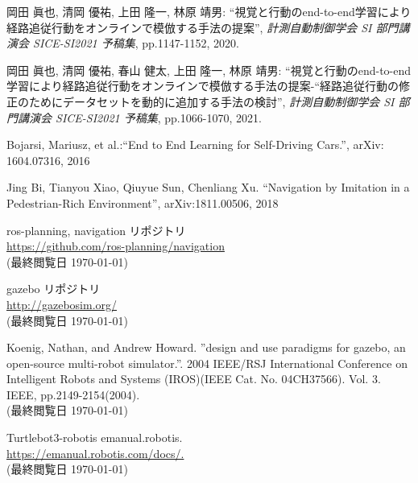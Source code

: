 \documentclass{ujarticle}
\begin{document}
\footnotesize
\begin{thebibliography}{99}

岡田 眞也, 清岡 優祐, 上田 隆一, 林原 靖男: ``視覚と行動のend-to-end学習により経路追従行動をオンラインで模倣する手法の提案'', \textit{計測自動制御学会 SI 部門講演会 SICE-SI2021 予稿集}, pp.1147-1152, 2020.

岡田 眞也, 清岡 優祐, 春山 健太, 上田 隆一, 林原 靖男: ``視覚と行動のend-to-end学習により経路追従行動をオンラインで模倣する手法の提案-“経路追従行動の修正のためにデータセットを動的に追加する手法の検討'', \textit{計測自動制御学会 SI 部門講演会 SICE-SI2021 予稿集}, pp.1066-1070, 2021.	

Bojarsi, Mariusz, et al.:``End to End Learning for Self-Driving Cars.'', arXiv: 1604.07316, 2016

Jing Bi, Tianyou Xiao, Qiuyue Sun, Chenliang Xu. ``Navigation by Imitation in a Pedestrian-Rich Environment'', 	arXiv:1811.00506, 2018


ros-planning, navigation リポジトリ\\
\url{https://github.com/ros-planning/navigation}\\
(最終閲覧日 \today)

gazebo リポジトリ\\
\url{http://gazebosim.org/}\\
(最終閲覧日 \today)

Koenig, Nathan, and Andrew Howard. ”design and use paradigms for gazebo, an open-source multi-robot simulator.”. 2004 IEEE/RSJ International Conference on Intelligent Robots and Systems (IROS)(IEEE Cat. No. 04CH37566). Vol. 3. IEEE, pp.2149-2154(2004).\\
(最終閲覧日 \today)

Turtlebot3-robotis emanual.robotis.\\
\url{https://emanual.robotis.com/docs/.}\\
(最終閲覧日 \today)

\end{thebibliography}

\normalsize
\end{document}
